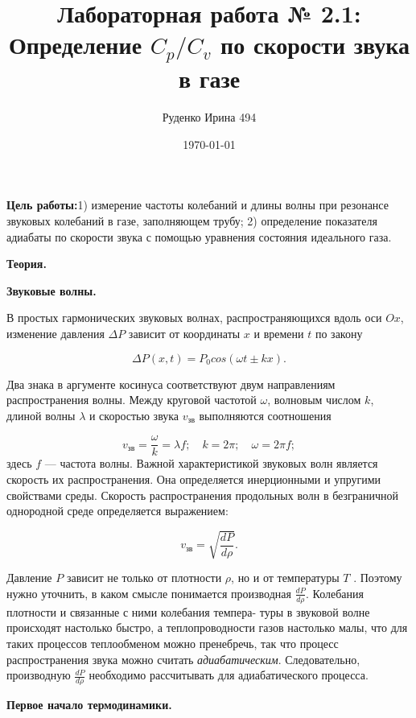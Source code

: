 \documentclass[10pt]{article}
\title{Лабораторная работа № 2.1:
    Определение $C_p/C_v$ по скорости звука в газе    
}
\date{\today}
\author{Руденко Ирина 494}
\begin{document}
    \maketitle
    \textbf{Цель работы:}1)  измерение частоты колебаний и длины волны при резонансе звуковых колебаний в газе, заполняющем трубу; 2) определение показателя адиабаты по скорости звука с помощью уравнения состояния идеального газа.

    \textbf{Теория.}

    \textbf{Звуковые волны.} 

    В простых гармонических звуковых волнах, распространяющихся вдоль оси $Ox$, изменение давления $\Delta P$ зависит от координаты $x$ и времени $t$ по закону

    \begin{equation}
        \Delta P(x,t) = P_0 cos(\omega t \pm kx).
    \end{equation}

    Два знака в аргументе косинуса соответствуют двум направлениям распространения волны. Между круговой частотой $\omega$, волновым числом $k$, длиной волны $\lambda$ и скоростью звука $v_\text{зв}$ выполняются соотношения

    \begin{equation}
        v_\text{зв} = \frac{\omega}{k} = \lambda f; \quad k = 2\pi; \quad \omega = 2\pi f;
    \end{equation}
    здесь $f$ — частота волны.
    Важной характеристикой звуковых волн является скорость их
    распространения. Она определяется инерционными и упругими свойствами среды. Скорость распространения продольных волн в безграничной однородной среде определяется выражением:
     
    \begin{equation}
        v_\text{зв} = \sqrt{\frac{dP}{d\rho}}.
    \end{equation}

    Давление $P$ зависит не только от плотности $\rho$, но и от температуры $T$ . Поэтому нужно уточнить, в каком смысле понимается производная $\frac{dP}{d\rho}$.
    Колебания плотности и связанные с ними колебания темпера- туры в звуковой волне происходят настолько быстро, а теплопроводности газов настолько малы, что для таких процессов теплообменом можно пренебречь, так что процесс распространения звука можно считать \textit{адиабатическим}. Следовательно, производную $\frac{dP}{d\rho}$ необходимо рассчитывать для адиабатического процесса.


    \textbf{ Первое начало термодинамики.}
\end{document}
